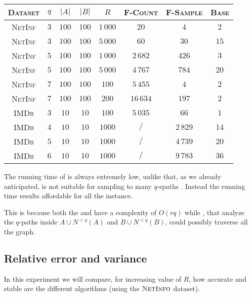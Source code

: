 	\begin{table}[h]
		\centering
		\begin{tabular}{|c|c|c|c|c|c|c|c|}
			\hline
			\textsc{Dataset}       & $q$  & $|A|$ & $|B|$ & $R$ & \textsc{F-Count} & \textsc{F-Sample} & \textsc{Base} \\ \hline \hline
			\textsc{NetInf} & $3$  & $100$ & $100$ & $1\,000$ & $20$ & $4$ & $2$ \\ \hline
			\textsc{NetInf} & $3$  & $100$ & $100$ & $5\,000$ & $60$ & $30$ & $15$ \\ \hline
			\textsc{NetInf} & $5$  & $100$ & $100$ & $1\,000$ & $2\,682$ & $426$ & $3$ \\ \hline
			\textsc{NetInf} & $5$  & $100$ & $100$ & $5\,000$ & $4\,767$ & $784$ & $20$ \\ \hline
			\textsc{NetInf} & $7$  & $100$ & $100$ & $100$ & $5\,455$ & $4$ & $2$ \\ \hline
			\textsc{NetInf} & $7$  & $100$ & $100$ & $200$ & $16\,634$ & $197$ & $2$ \\ \hline \hline
			\textsc{IMDb}   & $3$  & $10$ & $10$ & $100$ & $5\,035$ & $66$ & $1$ \\ \hline
			\textsc{IMDb}   & $4$  & $10$ & $10$ & $1000$ & $/$ & $2\,829$ & $14$ \\ \hline
			\textsc{IMDb}   & $5$  & $10$ & $10$ & $1000$ & $/$ & $4\,739$ & $20$ \\ \hline
			\textsc{IMDb}   & $6$  & $10$ & $10$ & $1000$ & $/$ & $9\,783$ & $36$ \\ \hline
		\end{tabular}
	\end{table}
	
	The running time of \base is always extremely low, 
	unlike \fcount that, as we already anticipated, is not suitable for sampling to many $q$-spaths .
	Instead the running time \fsamp results affordable for all the instance. 
	
	This is because both the \fsamp and \base have a complexity of $O(rq)$ while 
	\fcount, that analyze the $q$-paths inside $A \cup N^{<q}(A)$ and $B \cup N^{<q}(B)$, could possibly traverse all the graph.
	 
	\subsection*{Relative error and variance}
	
	In this experiment we will compare, for increasing value of $R$, how accurate and stable are the different algorithms (using the $\textsc{NetInfo}$ dataset).\medskip
		
